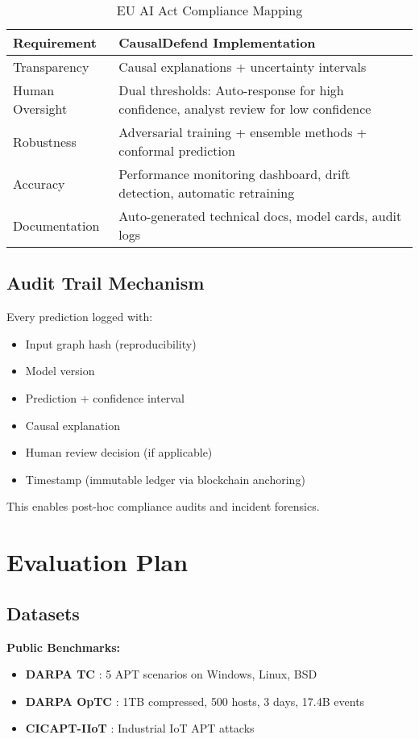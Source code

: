 \documentclass[conference]{IEEEtran}
\begin{document}
\begin{table*}[!t]
\centering
\caption{EU AI Act Compliance Mapping}
\begin{tabular}{|p{4cm}|p{10cm}|}
\hline
\textbf{Requirement} & \textbf{CausalDefend Implementation} \\
\hline
Transparency & Causal explanations + uncertainty intervals \\
\hline
Human Oversight & Dual thresholds: Auto-response for high confidence, analyst review for low confidence \\
\hline
Robustness & Adversarial training + ensemble methods + conformal prediction \\
\hline
Accuracy & Performance monitoring dashboard, drift detection, automatic retraining \\
\hline
Documentation & Auto-generated technical docs, model cards, audit logs \\
\hline
\end{tabular}
\end{table*}

\subsection{Audit Trail Mechanism}

Every prediction logged with:
\begin{itemize}
    \item Input graph hash (reproducibility)
    \item Model version
    \item Prediction + confidence interval
    \item Causal explanation
    \item Human review decision (if applicable)
    \item Timestamp (immutable ledger via blockchain anchoring)
\end{itemize}

This enables post-hoc compliance audits and incident forensics.

\section{Evaluation Plan}\label{sec:evaluation}

\subsection{Datasets}

\textbf{Public Benchmarks:}
\begin{itemize}
    \item \textbf{DARPA TC} \cite{darpa_tc}: 5 APT scenarios on Windows, Linux, BSD
    \item \textbf{DARPA OpTC} \cite{optic_dataset}: 1TB compressed, 500 hosts, 3 days, 17.4B events
    \item \textbf{CICAPT-IIoT} \cite{cicapt}: Industrial IoT APT attacks
\end{itemize}
\end{document}
